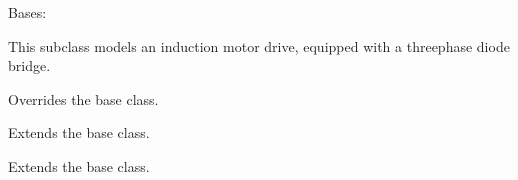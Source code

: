 \documentclass[letterpaper,10pt,english]{sphinxmanual}
\begin{document}
\begin{fulllineitems}
\label{\detokenize{model:model.im_drive.DriveWithDiodeBridge}}
\pysigstartsignatures
{}
\pysigstopsignatures
\sphinxAtStartPar
Bases: {\hyperref[\detokenize{model:model.im_drive.Drive}]{}}

\sphinxAtStartPar
This subclass models an induction motor drive, equipped with a three\sphinxhyphen{}phase
diode bridge.

\begin{fulllineitems}
\label{\detokenize{model:model.im_drive.DriveWithDiodeBridge.f}}
\pysigstartsignatures
{}
\pysigstopsignatures
\sphinxAtStartPar
Overrides the base class.

\end{fulllineitems}


\begin{fulllineitems}
\label{\detokenize{model:model.im_drive.DriveWithDiodeBridge.get_initial_values}}
\pysigstartsignatures
{}
\pysigstopsignatures
\sphinxAtStartPar
Extends the base class.

\end{fulllineitems}


\begin{fulllineitems}
\label{\detokenize{model:model.im_drive.DriveWithDiodeBridge.set_initial_values}}
\pysigstartsignatures
{}
\pysigstopsignatures
\sphinxAtStartPar
Extends the base class.

\end{fulllineitems}


\end{fulllineitems}
\end{document}
